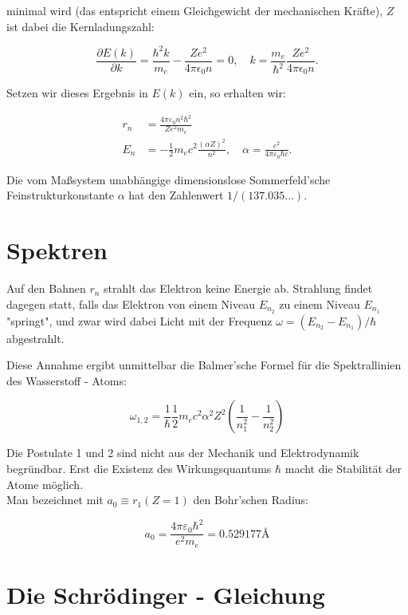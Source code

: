 \documentclass[10pt, letterpaper]{article}
\begin{document}
minimal wird (das entspricht einem Gleichgewicht der mechanischen Kräfte), $Z$ ist dabei die Kernladungszahl:

$$
\frac{\partial E(k)}{\partial k}=\frac{\hbar^{2} k}{m_{e}}-\frac{Z e^{2}}{4 \pi \epsilon_{0} n}=0, \quad k=\frac{m_{e}}{\hbar^{2}} \frac{Z e^{2}}{4 \pi \epsilon_{0} n} .
$$

Setzen wir dieses Ergebnis in $E(k)$ ein, so erhalten wir:

$$
\begin{aligned}
r_{n} & =\frac{4 \pi \varepsilon_{0} n^{2} \hbar^{2}}{Z e^{2} m_{e}} \\
E_{n} & =-\frac{1}{2} m_{e} c^{2} \frac{(\alpha Z)^{2}}{n^{2}}, \quad \alpha=\frac{e^{2}}{4 \pi \varepsilon_{0} \hbar c} .
\end{aligned}
$$

Die vom Maßsystem unabhängige dimensionslose Sommerfeld'sche Feinstrukturkonstante $\alpha$ hat den Zahlenwert $1 /(137.035 \ldots)$.

\section*{Spektren}
Auf den Bahnen $r_{n}$ strahlt das Elektron keine Energie ab. Strahlung findet dagegen statt, falls das Elektron von einem Niveau $E_{n_{2}}$ zu einem Niveau $E_{n_{1}}$ "springt", und zwar wird dabei Licht mit der Frequenz $\omega=\left(E_{n_{2}}-E_{n_{1}}\right) / \hbar$ abgestrahlt.

Diese Annahme ergibt unmittelbar die Balmer'sche Formel für die Spektrallinien des Wasserstoff - Atoms:

$$
\omega_{1,2}=\frac{1}{\hbar} \frac{1}{2} m_{e} c^{2} \alpha^{2} Z^{2}\left(\frac{1}{n_{1}^{2}}-\frac{1}{n_{2}^{2}}\right)
$$

Die Postulate 1 und 2 sind nicht aus der Mechanik und Elektrodynamik begründbar. Erst die Existenz des Wirkungsquantums $\hbar$ macht die Stabilität der Atome möglich.\\
Man bezeichnet mit $a_{0} \equiv r_{1}(Z=1)$ den Bohr'schen Radius:

$$
a_{0}=\frac{4 \pi \varepsilon_{0} \hbar^{2}}{e^{2} m_{e}}=0.529177 \text{\AA}
$$








\pagebreak



\section{Die Schrödinger - Gleichung}
\end{document}
